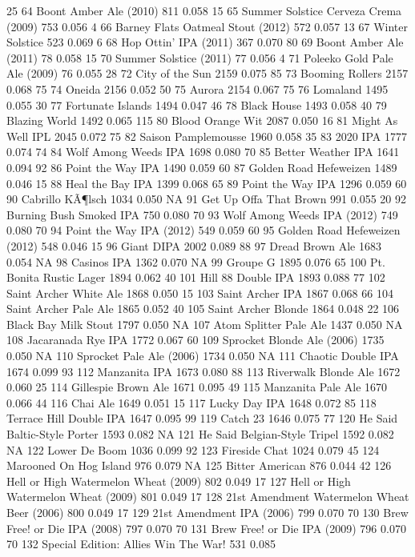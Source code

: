 \documentclass[]{article}
\begin{document}
25 64 Boont Amber Ale (2010) 811 0.058 15 65 Summer Solstice Cerveza
Crema (2009) 753 0.056 4 66 Barney Flats Oatmeal Stout (2012) 572 0.057
13 67 Winter Solstice 523 0.069 6 68 Hop Ottin' IPA (2011) 367 0.070 80
69 Boont Amber Ale (2011) 78 0.058 15 70 Summer Solstice (2011) 77 0.056
4 71 Poleeko Gold Pale Ale (2009) 76 0.055 28 72 City of the Sun 2159
0.075 85 73 Booming Rollers 2157 0.068 75 74 Oneida 2156 0.052 50 75
Aurora 2154 0.067 75 76 Lomaland 1495 0.055 30 77 Fortunate Islands 1494
0.047 46 78 Black House 1493 0.058 40 79 Blazing World 1492 0.065 115 80
Blood Orange Wit 2087 0.050 16 81 Might As Well IPL 2045 0.072 75 82
Saison Pamplemousse 1960 0.058 35 83 2020 IPA 1777 0.074 74 84 Wolf
Among Weeds IPA 1698 0.080 70 85 Better Weather IPA 1641 0.094 92 86
Point the Way IPA 1490 0.059 60 87 Golden Road Hefeweizen 1489 0.046 15
88 Heal the Bay IPA 1399 0.068 65 89 Point the Way IPA 1296 0.059 60 90
Cabrillo KÃ¶lsch 1034 0.050 NA 91 Get Up Offa That Brown 991 0.055 20 92
Burning Bush Smoked IPA 750 0.080 70 93 Wolf Among Weeds IPA (2012) 749
0.080 70 94 Point the Way IPA (2012) 549 0.059 60 95 Golden Road
Hefeweizen (2012) 548 0.046 15 96 Giant DIPA 2002 0.089 88 97 Dread
Brown Ale 1683 0.054 NA 98 Casinos IPA 1362 0.070 NA 99 Groupe G 1895
0.076 65 100 Pt. Bonita Rustic Lager 1894 0.062 40 101 Hill 88 Double
IPA 1893 0.088 77 102 Saint Archer White Ale 1868 0.050 15 103 Saint
Archer IPA 1867 0.068 66 104 Saint Archer Pale Ale 1865 0.052 40 105
Saint Archer Blonde 1864 0.048 22 106 Black Bay Milk Stout 1797 0.050 NA
107 Atom Splitter Pale Ale 1437 0.050 NA 108 Jacaranada Rye IPA 1772
0.067 60 109 Sprocket Blonde Ale (2006) 1735 0.050 NA 110 Sprocket Pale
Ale (2006) 1734 0.050 NA 111 Chaotic Double IPA 1674 0.099 93 112
Manzanita IPA 1673 0.080 88 113 Riverwalk Blonde Ale 1672 0.060 25 114
Gillespie Brown Ale 1671 0.095 49 115 Manzanita Pale Ale 1670 0.066 44
116 Chai Ale 1649 0.051 15 117 Lucky Day IPA 1648 0.072 85 118 Terrace
Hill Double IPA 1647 0.095 99 119 Catch 23 1646 0.075 77 120 He Said
Baltic-Style Porter 1593 0.082 NA 121 He Said Belgian-Style Tripel 1592
0.082 NA 122 Lower De Boom 1036 0.099 92 123 Fireside Chat 1024 0.079 45
124 Marooned On Hog Island 976 0.079 NA 125 Bitter American 876 0.044 42
126 Hell or High Watermelon Wheat (2009) 802 0.049 17 127 Hell or High
Watermelon Wheat (2009) 801 0.049 17 128 21st Amendment Watermelon Wheat
Beer (2006) 800 0.049 17 129 21st Amendment IPA (2006) 799 0.070 70 130
Brew Free! or Die IPA (2008) 797 0.070 70 131 Brew Free! or Die IPA
(2009) 796 0.070 70 132 Special Edition: Allies Win The War! 531 0.085
\end{document}
